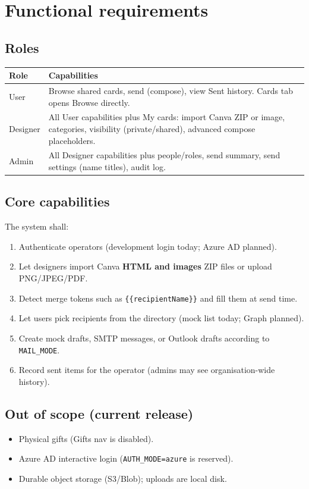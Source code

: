 \documentclass[11pt,a4paper]{article}
\begin{document}
\section{Functional requirements}

\subsection{Roles}
\begin{tabularx}{\textwidth}{lX}
  \toprule
  \textbf{Role} & \textbf{Capabilities} \\
  \midrule
  User & Browse shared cards, send (compose), view Sent history. Cards tab opens Browse directly. \\
  Designer & All User capabilities plus My cards: import Canva ZIP or image, categories, visibility (private/shared), advanced compose placeholders. \\
  Admin & All Designer capabilities plus people/roles, send summary, send settings (name titles), audit log. \\
  \bottomrule
\end{tabularx}

\subsection{Core capabilities}
The system shall:
\begin{enumerate}[leftmargin=1.6em]
  \item Authenticate operators (development login today; Azure AD planned).
  \item Let designers import Canva \textbf{HTML and images} ZIP files or upload PNG/JPEG/PDF.
  \item Detect merge tokens such as \texttt{\{\{recipientName\}\}} and fill them at send time.
  \item Let users pick recipients from the directory (mock list today; Graph planned).
  \item Create mock drafts, SMTP messages, or Outlook drafts according to \texttt{MAIL\_MODE}.
  \item Record sent items for the operator (admins may see organisation-wide history).
\end{enumerate}

\subsection{Out of scope (current release)}
\begin{itemize}[leftmargin=1.4em]
  \item Physical gifts (Gifts nav is disabled).
  \item Azure AD interactive login (\texttt{AUTH\_MODE=azure} is reserved).
  \item Durable object storage (S3/Blob); uploads are local disk.
\end{itemize}
\end{document}
